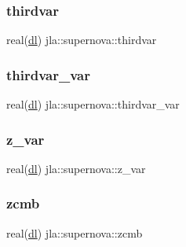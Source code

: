 \subsubsection{\texorpdfstring{thirdvar}{thirdvar}}
{\footnotesize\ttfamily real(\mbox{\hyperlink{namespacejla_a3aa6435b4e08f1d532390186ac608741}{dl}}) jla\+::supernova\+::thirdvar\hspace{0.3cm}{\ttfamily [private]}}

\mbox{\label{structjla_1_1supernova_ab0b5176f0bd19f62fea30621e42bc54c}} 
\subsubsection{\texorpdfstring{thirdvar\+\_\+var}{thirdvar\_var}}
{\footnotesize\ttfamily real(\mbox{\hyperlink{namespacejla_a3aa6435b4e08f1d532390186ac608741}{dl}}) jla\+::supernova\+::thirdvar\+\_\+var\hspace{0.3cm}{\ttfamily [private]}}

\mbox{\label{structjla_1_1supernova_a365c3c52a4a225d0a82a48d6be366d07}} 
\subsubsection{\texorpdfstring{z\+\_\+var}{z\_var}}
{\footnotesize\ttfamily real(\mbox{\hyperlink{namespacejla_a3aa6435b4e08f1d532390186ac608741}{dl}}) jla\+::supernova\+::z\+\_\+var\hspace{0.3cm}{\ttfamily [private]}}

\mbox{\label{structjla_1_1supernova_a44fc1dba51a4fc0314d20c326d438fd7}} 
\subsubsection{\texorpdfstring{zcmb}{zcmb}}
{\footnotesize\ttfamily real(\mbox{\hyperlink{namespacejla_a3aa6435b4e08f1d532390186ac608741}{dl}}) jla\+::supernova\+::zcmb\hspace{0.3cm}{\ttfamily [private]}}

